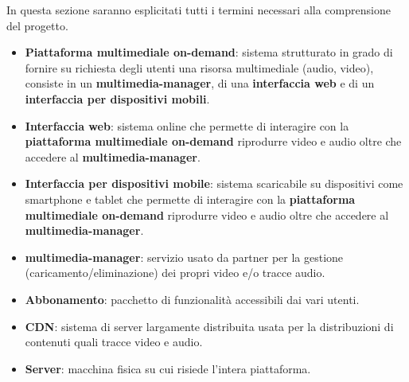  In questa sezione saranno esplicitati tutti i termini necessari alla comprensione del progetto.

\begin{itemize}
    	\item \textbf{Piattaforma multimediale on-demand}: sistema strutturato in grado di fornire su richiesta degli utenti una risorsa multimediale (audio, video), consiste in un  \textbf{multimedia-manager}, di una  \textbf{interfaccia web} e di un  \textbf{interfaccia per dispositivi mobili}.
	\item \textbf{Interfaccia web}: sistema online che permette di interagire con la  \textbf{piattaforma multimediale on-demand} riprodurre video e audio oltre che accedere al  \textbf{multimedia-manager}.
	\item \textbf{Interfaccia per dispositivi mobile}:  sistema scaricabile su dispositivi come smartphone e tablet che permette di interagire con la  \textbf{piattaforma multimediale on-demand} riprodurre video e audio oltre che accedere al  \textbf{multimedia-manager}.
	\item  \textbf{multimedia-manager}: servizio usato da partner per la gestione (caricamento/eliminazione) dei propri video e/o tracce audio.
	\item \textbf{Abbonamento}: pacchetto di funzionalità accessibili dai vari utenti.
	\item \textbf{CDN}: sistema di server largamente distribuita usata per la distribuzioni di contenuti quali tracce video e audio.
	\item \textbf{Server}: macchina fisica su cui risiede l'intera piattaforma.
\end{itemize}